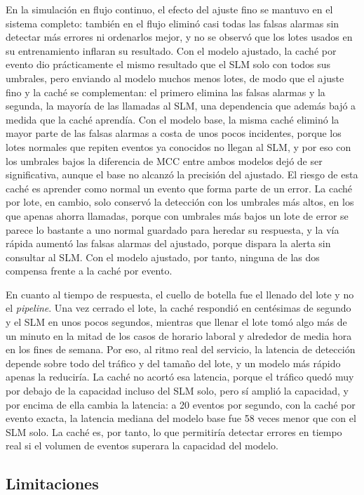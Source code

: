 En la simulación en flujo continuo, el efecto del ajuste fino se mantuvo en el sistema completo: también en el flujo eliminó casi todas las falsas alarmas sin detectar más errores ni ordenarlos mejor, y no se observó que los lotes usados en su entrenamiento inflaran su resultado. Con el modelo ajustado, la caché por evento dio prácticamente el mismo resultado que el SLM solo con todos sus umbrales, pero enviando al modelo muchos menos lotes, de modo que el ajuste fino y la caché se complementan: el primero elimina las falsas alarmas y la segunda, la mayoría de las llamadas al SLM, una dependencia que además bajó a medida que la caché aprendía. Con el modelo base, la misma caché eliminó la mayor parte de las falsas alarmas a costa de unos pocos incidentes, porque los lotes normales que repiten eventos ya conocidos no llegan al SLM, y por eso con los umbrales bajos la diferencia de MCC entre ambos modelos dejó de ser significativa, aunque el base no alcanzó la precisión del ajustado. El riesgo de esta caché es aprender como normal un evento que forma parte de un error. La caché por lote, en cambio, solo conservó la detección con los umbrales más altos, en los que apenas ahorra llamadas, porque con umbrales más bajos un lote de error se parece lo bastante a uno normal guardado para heredar su respuesta, y la vía rápida aumentó las falsas alarmas del ajustado, porque dispara la alerta sin consultar al SLM. Con el modelo ajustado, por tanto, ninguna de las dos compensa frente a la caché por evento.

En cuanto al tiempo de respuesta, el cuello de botella fue el llenado del lote y no el \textit{pipeline}. Una vez cerrado el lote, la caché respondió en centésimas de segundo y el SLM en unos pocos segundos, mientras que llenar el lote tomó algo más de un minuto en la mitad de los casos de horario laboral y alrededor de media hora en los fines de semana. Por eso, al ritmo real del servicio, la latencia de detección depende sobre todo del tráfico y del tamaño del lote, y un modelo más rápido apenas la reduciría. La caché no acortó esa latencia, porque el tráfico quedó muy por debajo de la capacidad incluso del SLM solo, pero sí amplió la capacidad, y por encima de ella cambia la latencia: a 20 eventos por segundo, con la caché por evento exacta, la latencia mediana del modelo base fue 58 veces menor que con el SLM solo. La caché es, por tanto, lo que permitiría detectar errores en tiempo real si el volumen de eventos superara la capacidad del modelo.

\subsection{Limitaciones}\label{sec:limitaciones}

